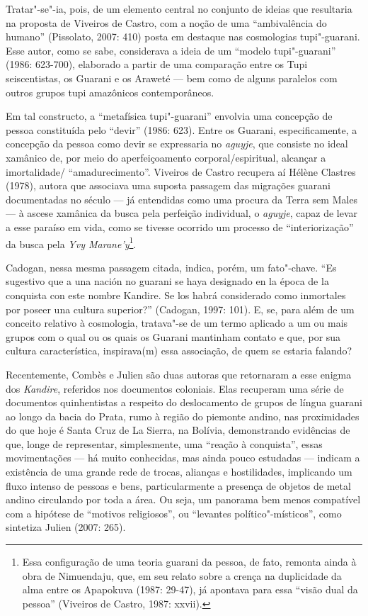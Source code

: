 Tratar"-se"-ia, pois, de um elemento central no conjunto de ideias que
resultaria na proposta de Viveiros de Castro, com a noção de uma
``ambivalência do humano'' (Pissolato, 2007: 410) posta em destaque nas
cosmologias tupi"-guarani. Esse autor, como se sabe, considerava a ideia
de um ``modelo tupi"-guarani'' (1986: 623-700), elaborado a partir de uma
comparação entre os Tupi seiscentistas, os Guarani e os Araweté --- bem
como de alguns paralelos com outros grupos tupi amazônicos
contemporâneos.

Em tal constructo, a ``metafísica tupi"-guarani'' envolvia uma concepção de
pessoa constituída pelo ``devir'' (1986: 623). Entre os Guarani,
especificamente, a concepção da pessoa como devir se expressaria no
\emph{aguyje}, que consiste no ideal xamânico de, por meio do aperfeiçoamento
corporal/espiritual, alcançar a imortalidade/ ``amadurecimento''.
Viveiros de Castro recupera aí Hélène Clastres (1978), autora que
associava uma suposta passagem das migrações guarani documentadas no
século  --- já entendidas como uma procura da Terra sem Males --- à
ascese xamânica da busca pela perfeição individual, o \emph{aguyje}, capaz de
levar a esse paraíso em vida, como se tivesse ocorrido um processo de
``interiorização'' da busca pela \emph{Yvy Marane’y}\footnote{Essa configuração
de uma teoria guarani da pessoa, de fato, remonta ainda à obra de
Nimuendaju, que, em seu relato sobre a crença na duplicidade da alma
entre os Apapokuva (1987: 29-47), já apontava para essa ``visão dual da
pessoa'' (Viveiros de Castro, 1987: xxvii).}.

Cadogan, nessa mesma passagem citada, indica, porém, um fato"-chave. ``Es
sugestivo que a una nación no guarani se haya designado en la época de
la conquista con este nombre Kandire. Se los habrá considerado como
inmortales por poseer una cultura superior?'' (Cadogan, 1997: 101). E,
se, para além de um conceito relativo à cosmologia, tratava"-se de um
termo aplicado a um ou mais grupos com o qual ou os quais os Guarani
mantinham contato e que, por sua cultura característica, inspirava(m)
essa associação, de quem se estaria falando?

Recentemente, Combès e Julien são duas autoras que retornaram a esse
enigma dos \emph{Kandire}, referidos nos documentos coloniais. Elas recuperam
uma série de documentos quinhentistas a respeito do deslocamento de
grupos de língua guarani ao longo da bacia do Prata, rumo à região do
piemonte andino, nas proximidades do que hoje é Santa Cruz de La
Sierra, na Bolívia, demonstrando evidências de que, longe de
representar, simplesmente, uma ``reação à conquista'', essas
movimentações --- há muito conhecidas, mas ainda pouco estudadas ---
indicam a existência de uma grande rede de trocas, alianças e
hostilidades, implicando um fluxo intenso de pessoas e bens,
particularmente a presença de objetos de metal andino circulando por
toda a área. Ou seja, um panorama bem menos compatível com a hipótese
de ``motivos religiosos'', ou ``levantes político"-místicos'', como
sintetiza Julien (2007: 265).

